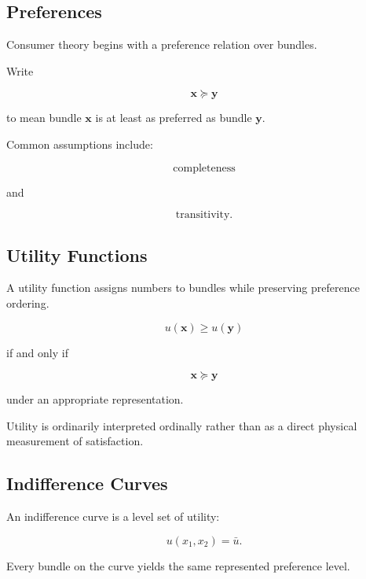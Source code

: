 \subsection{Preferences}
\label{subsec:consumer-preferences}

Consumer theory begins with a preference relation over bundles.

Write

\[
\boxed{
\mathbf{x}\succeq\mathbf{y}
}
\]

to mean bundle \(\mathbf{x}\) is at least as preferred as bundle
\(\mathbf{y}\).

Common assumptions include:

\[
\boxed{
\text{completeness}
}
\]

and

\[
\boxed{
\text{transitivity}.
}
\]

\subsection{Utility Functions}
\label{subsec:utility-functions}

A utility function assigns numbers to bundles while preserving preference
ordering.

\[
\boxed{
u(\mathbf{x})
\geq
u(\mathbf{y})
}
\]

if and only if

\[
\mathbf{x}
\succeq
\mathbf{y}
\]

under an appropriate representation.

Utility is ordinarily interpreted ordinally rather than as a direct physical
measurement of satisfaction.

\subsection{Indifference Curves}
\label{subsec:indifference-curves}

An indifference curve is a level set of utility:

\[
\boxed{
u(x_1,x_2)=\bar u.
}
\]

Every bundle on the curve yields the same represented preference level.

